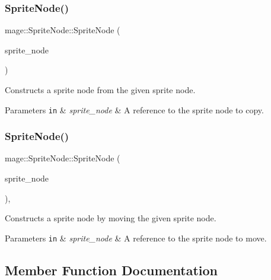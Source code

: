 \subsubsection{\texorpdfstring{Sprite\+Node()}{SpriteNode()}\hspace{0.1cm}{\footnotesize\ttfamily [2/3]}}
{\footnotesize\ttfamily mage\+::\+Sprite\+Node\+::\+Sprite\+Node (\begin{DoxyParamCaption}\item[{const \hyperlink{classmage_1_1_sprite_node}{Sprite\+Node} \&}]{sprite\+\_\+node }\end{DoxyParamCaption})\hspace{0.3cm}{\ttfamily [protected]}}

Constructs a sprite node from the given sprite node.


\begin{DoxyParams}[1]{Parameters}
\mbox{\tt in}  & {\em sprite\+\_\+node} & A reference to the sprite node to copy. \\
\hline
\end{DoxyParams}
\hypertarget{classmage_1_1_sprite_node_af57c27c8fd399eb00f46a482192f6994}{}\label{classmage_1_1_sprite_node_af57c27c8fd399eb00f46a482192f6994} 
\subsubsection{\texorpdfstring{Sprite\+Node()}{SpriteNode()}\hspace{0.1cm}{\footnotesize\ttfamily [3/3]}}
{\footnotesize\ttfamily mage\+::\+Sprite\+Node\+::\+Sprite\+Node (\begin{DoxyParamCaption}\item[{\hyperlink{classmage_1_1_sprite_node}{Sprite\+Node} \&\&}]{sprite\+\_\+node }\end{DoxyParamCaption})\hspace{0.3cm}{\ttfamily [protected]}, {\ttfamily [default]}}

Constructs a sprite node by moving the given sprite node.


\begin{DoxyParams}[1]{Parameters}
\mbox{\tt in}  & {\em sprite\+\_\+node} & A reference to the sprite node to move. \\
\hline
\end{DoxyParams}


\subsection{Member Function Documentation}
\hypertarget{classmage_1_1_sprite_node_a16481829a3796abd5afe5ce0c9ebf578}{}\label{classmage_1_1_sprite_node_a16481829a3796abd5afe5ce0c9ebf578} 
